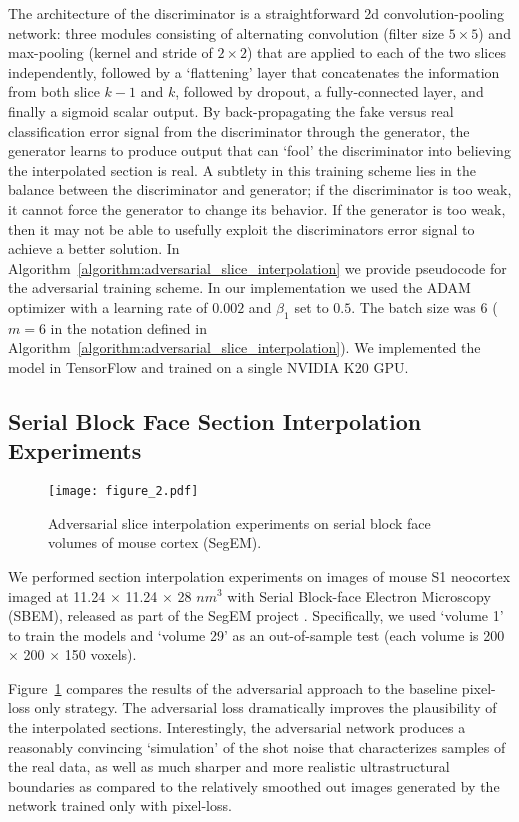 \documentclass{article} %
\begin{document}
The architecture of the discriminator is a straightforward 2d convolution-pooling network: three modules consisting of alternating convolution (filter size $5 \times 5$) and max-pooling (kernel and stride of $2 \times 2$) that are applied to each of the two slices independently, followed by a `flattening' layer that concatenates the information from both slice $k-1$ and $k$, followed by dropout, a fully-connected layer, and finally a sigmoid scalar output. By back-propagating the fake versus real classification error signal from the discriminator through the generator, the generator learns to produce output that can `fool' the discriminator into believing the interpolated section is real. A subtlety in this training scheme lies in the balance between the discriminator and generator; if the discriminator is too weak, it cannot force the generator to change its behavior. If the generator is too weak, then it may not be able to usefully exploit the discriminators error signal to achieve a better solution. In Algorithm~\ref{algorithm:adversarial_slice_interpolation} we provide pseudocode for the adversarial training scheme. In our implementation we used the ADAM optimizer \cite{adam} with a learning rate of $0.002$ and $\beta_1$ set to $0.5$. The batch size was 6 ($m=6$ in the notation defined in Algorithm~\ref{algorithm:adversarial_slice_interpolation}). We implemented the model in TensorFlow and trained on a single NVIDIA K20 GPU. 

\subsection{Serial Block Face Section Interpolation Experiments}
\begin{figure}
    \centering
    \texttt{[image: figure\_2.pdf]}
    \caption{Adversarial slice interpolation experiments on serial block face volumes of mouse cortex (SegEM).}
    \label{fig:experiments_slice_interpolation_segem}
\end{figure}
We performed section interpolation experiments on images of mouse S1 neocortex imaged at 11.24 $\times$ 11.24 $\times$ 28 $nm^3$ with Serial Block-face Electron Microscopy (SBEM), released as part of the SegEM project \cite{berning2015segem}. Specifically, we used `volume 1' to train the models and `volume 29' as an out-of-sample test (each volume is 200 $\times$ 200 $\times$ 150 voxels). 

Figure~\ref{fig:experiments_slice_interpolation_segem} compares the results of the adversarial approach to the baseline pixel-loss only strategy. The adversarial loss dramatically improves the plausibility of the interpolated sections. Interestingly, the adversarial network produces a reasonably convincing `simulation' of the shot noise that characterizes samples of the real data, as well as much sharper and more realistic ultrastructural boundaries as compared to the relatively smoothed out images generated by the network trained only with pixel-loss.  
\end{document}
